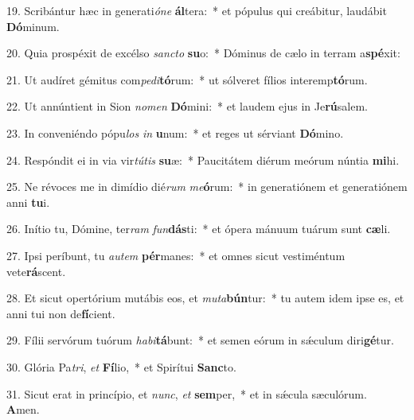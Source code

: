 19. Scribántur hæc in generati\textit{ó}\textit{ne} \textbf{ál}tera:~*  et pópulus qui creábitur, laudábit \textbf{Dó}minum.\

20. Quia prospéxit de excélso \textit{sanc}\textit{to} \textbf{su}o:~*  Dóminus de cælo in terram a\textbf{spé}xit:\

21. Ut audíret gémitus com\textit{pe}\textit{di}\textbf{tó}rum:~*  ut sólveret fílios interemp\textbf{tó}rum.\

22. Ut annúntient in Sion \textit{no}\textit{men} \textbf{Dó}mini:~*  et laudem ejus in Je\textbf{rú}salem.\

23. In conveniéndo pópu\textit{los} \textit{in} \textbf{u}num:~*  et reges ut sérviant \textbf{Dó}mino.\

24. Respóndit ei in via vir\textit{tú}\textit{tis} \textbf{su}æ:~*  Paucitátem diérum meórum núntia \textbf{mi}hi.\

25. Ne révoces me in dimídio dié\textit{rum} \textit{me}\textbf{ó}rum:~*  in generatiónem et generatiónem anni \textbf{tu}i.\

26. Inítio tu, Dómine, ter\textit{ram} \textit{fun}\textbf{dás}ti:~*  et ópera mánuum tuárum sunt \textbf{cæ}li.\

27. Ipsi períbunt, tu \textit{au}\textit{tem} \textbf{pér}manes:~*  et omnes sicut vestiméntum vete\textbf{rá}scent.\

28. Et sicut opertórium mutábis eos, et \textit{mu}\textit{ta}\textbf{bún}tur:~*  tu autem idem ipse es, et anni tui non de\textbf{fí}cient.\

29. Fílii servórum tuórum \textit{ha}\textit{bi}\textbf{tá}bunt:~*  et semen eórum in sǽculum diri\textbf{gé}tur.\

30. Glória Pa\textit{tri}, \textit{et} \textbf{Fí}lio,~*  et Spirítui \textbf{Sanc}to.\

31. Sicut erat in princípio, et \textit{nunc}, \textit{et} \textbf{sem}per,~*  et in sǽcula sæculórum. \textbf{A}men.\

